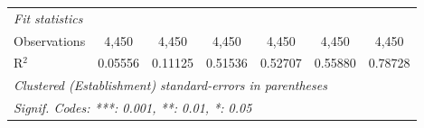 \begin{tabular}{lcccccc}
   \midrule
   \emph{Fit statistics}\\
   Observations     & 4,450          & 4,450          & 4,450          & 4,450          & 4,450         & 4,450\\  
   R$^2$            & 0.05556        & 0.11125        & 0.51536        & 0.52707        & 0.55880       & 0.78728\\  
   \midrule \midrule
   \multicolumn{7}{l}{\emph{Clustered (Establishment) standard-errors in parentheses}}\\
   \multicolumn{7}{l}{\emph{Signif. Codes: ***: 0.001, **: 0.01, *: 0.05}}\\
\end{tabular}
\par\endgroup



